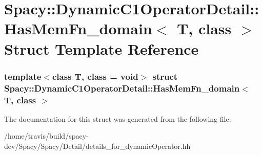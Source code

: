 \hypertarget{structSpacy_1_1DynamicC1OperatorDetail_1_1HasMemFn__domain}{\section{\-Spacy\-:\-:\-Dynamic\-C1\-Operator\-Detail\-:\-:\-Has\-Mem\-Fn\-\_\-domain$<$ \-T, class $>$ \-Struct \-Template \-Reference}
\label{structSpacy_1_1DynamicC1OperatorDetail_1_1HasMemFn__domain}
}
\subsubsection*{template$<$class T, class = void$>$ struct Spacy\-::\-Dynamic\-C1\-Operator\-Detail\-::\-Has\-Mem\-Fn\-\_\-domain$<$ T, class $>$}



\-The documentation for this struct was generated from the following file\-:\begin{DoxyCompactItemize}
\item 
/home/travis/build/spacy-\/dev/\-Spacy/\-Spacy/\-Detail/details\-\_\-for\-\_\-dynamic\-Operator.\-hh\end{DoxyCompactItemize}
